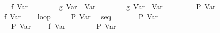 \documentclass{llncs}
\begin{document}
\begin{isabellebody}
\ \ \ \ {}\ {}\ {}{}\ f\ {}Var\ {}{}\isanewline
\ \ \ \ {}\ {}\ {}{}\ g\ {}Var\ {}{}\ {}Var\ {}{}\isanewline
\ \ \ \ {}\ {}\ {}{}\ g\ {}Var\ {}{}\ {}Var\ {}{}\isanewline
\ \ \ \ {}\isanewline
\ \ {}\ P\ {}Var\ {}{}\isanewline
\ \ {}\ {}\ {}{}\ f\ {}Var\ {}{}\isanewline
\ \ {}\ loop\isanewline
\ \ \ \ {}\ {}{}P\ {}Var\ {}{}{}\ {}\ seq\isanewline
\ \ \ \ \ \ {}\ P\ {}Var\ {}{}\isanewline
\ \ \ \ \ \ {}\ {}{}{}P\ {}Var\ {}{}{}\ {}\ {}\ {}{}\ f\ {}Var\ {}{}{}\isanewline
\ \ \ \ \ \ {}\ P\ {}Var\ {}{}\isanewline

\end{isabellebody}
\end{document}
